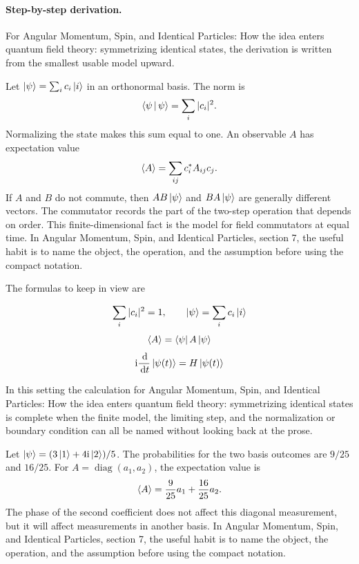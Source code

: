 \paragraph{Step-by-step derivation.}

For Angular Momentum, Spin, and Identical Particles: How the idea enters quantum field theory: symmetrizing identical states, the derivation is written from the smallest usable model upward.

Let \(\left|\psi\right\rangle=\sum_i c_i\left|i\right\rangle\) in an orthonormal basis.  The norm is
\[
  \left\langle \psi\,\middle|\,\psi\right\rangle=\sum_i |c_i|^2.
\]
Normalizing the state makes this sum equal to one.  An observable \(A\) has expectation value
\[
  \left\langle A\right\rangle=\sum_{ij}c_i^*A_{ij}c_j.
\]
If \(A\) and \(B\) do not commute, then \(AB\left|\psi\right\rangle\) and \(BA\left|\psi\right\rangle\) are generally different vectors.  The commutator records the part of the two-step operation that depends on order.  This finite-dimensional fact is the model for field commutators at equal time.  In Angular Momentum, Spin, and Identical Particles, section 7, the useful habit is to name the object, the operation, and the assumption before using the compact notation.

The formulas to keep in view are

\[
  \sum_i |c_i|^2=1,\qquad \left|\psi\right\rangle=\sum_i c_i\left|i\right\rangle
\]
\[
  \left\langle A\right\rangle=\left\langle \psi\right|A\left|\psi\right\rangle
\]
\[
  \mathrm i\frac{\,\mathrm d}{\,\mathrm d t}\left|\psi(t)\right\rangle=H\left|\psi(t)\right\rangle
\]

In this setting the calculation for Angular Momentum, Spin, and Identical Particles: How the idea enters quantum field theory: symmetrizing identical states is complete when the finite model, the limiting step, and the normalization or boundary condition can all be named without looking back at the prose.




\begin{example}
Let \(\left|\psi\right\rangle=(3\left|1\right\rangle+4\mathrm i\left|2\right\rangle)/5\).  The probabilities for the two basis outcomes are \(9/25\) and \(16/25\).  For \(A=\operatorname{diag}(a_1,a_2)\), the expectation value is
\[
  \left\langle A\right\rangle=\frac{9}{25}a_1+\frac{16}{25}a_2.
\]
The phase of the second coefficient does not affect this diagonal measurement, but it will affect measurements in another basis.  In Angular Momentum, Spin, and Identical Particles, section 7, the useful habit is to name the object, the operation, and the assumption before using the compact notation.
\end{example}



